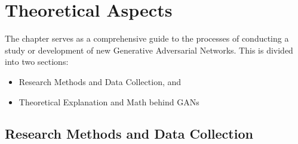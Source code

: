 \chapter{Theoretical Aspects}

\noindent
The chapter serves as a comprehensive guide to the processes of conducting a study or development of new Generative Adversarial Networks. This is divided into two sections:

\begin{itemize}
    \item Research Methods and Data Collection, and
    \item Theoretical Explanation and Math behind GANs
\end{itemize}


\section{Research Methods and Data Collection}

